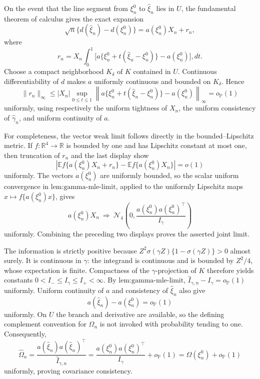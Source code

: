 On the event that the line segment from \(\xi_n^0\) to \(\widehat\xi_n\) lies in \(U\), the fundamental theorem of calculus gives the exact expansion
\[
 \sqrt n\{d(\widehat\xi_n)-d(\xi_n^0)\}
 =a(\xi_n^0)X_n+r_n,
\]
where
\[
 r_n=X_n\int_0^1
 \bigl[a\{\xi_n^0+t(\widehat\xi_n-\xi_n^0)\}-a(\xi_n^0)\bigr],dt.
\]
Choose a compact neighborhood \(K_\delta\) of \(K\) contained in \(U\).  Continuous differentiability of \(d\) makes \(a\) uniformly continuous and bounded on \(K_\delta\).  Hence
\[
 \|r_n\|_\infty
 \le |X_n|\sup_{0\le t\le1}
 \left\|a\{\xi_n^0+t(\widehat\xi_n-\xi_n^0)\}-a(\xi_n^0)\right\|_\infty
 =o_{\mathbb P}(1)
\]
uniformly, using respectively the uniform tightness of \(X_n\), the uniform consistency of \(\widehat\gamma_n\), and uniform continuity of \(a\).

For completeness, the vector weak limit follows directly in the bounded--Lipschitz metric.  If \(f:\mathbb R^4\to\mathbb R\) is bounded by one and has Lipschitz constant at most one, then truncation of \(r_n\) and the last display show
\[
 \left|\mathbb E f\{a(\xi_n^0)X_n+r_n\}
       -\mathbb E f\{a(\xi_n^0)X_n\}\right|=o(1)
\]
uniformly.  The vectors \(a(\xi_n^0)\) are uniformly bounded, so the scalar uniform convergence in \(\text{lem:gamma-mle-limit}\), applied to the uniformly Lipschitz maps \(x\mapsto f\{a(\xi_n^0)x\}\), gives
\[
 a(\xi_n^0)X_n\ \Rightarrow\
 \mathcal N_4\!\left(0,
   \frac{a(\xi_n^0)a(\xi_n^0)^\top}{I_\gamma}\right)
\]
uniformly.  Combining the preceding two displays proves the asserted joint limit.

The information is strictly positive because \(Z^2\sigma(\gamma Z)\{1-\sigma(\gamma Z)\}>0\) almost surely.  It is continuous in \(\gamma\): the integrand is continuous and is bounded by \(Z^2/4\), whose expectation is finite.  Compactness of the \(\gamma\)-projection of \(K\) therefore yields constants \(0<I_-\le I_\gamma\le I_+<\infty\).  By \(\text{lem:gamma-mle-limit}\), \(\widehat I_{\gamma,n}-I_\gamma=o_{\mathbb P}(1)\) uniformly.  Uniform continuity of \(a\) and consistency of \(\widehat\xi_n\) also give
\[
 a(\widehat\xi_n)-a(\xi_n^0)=o_{\mathbb P}(1)
\]
uniformly.  On \(U\) the branch and derivative are available, so the defining complement convention for \(\widehat\Omega_n\) is not invoked with probability tending to one.  Consequently,
\[
 \widehat\Omega_n
 =\frac{a(\widehat\xi_n)a(\widehat\xi_n)^\top}
        {\widehat I_{\gamma,n}}
 =\frac{a(\xi_n^0)a(\xi_n^0)^\top}{I_\gamma}
   +o_{\mathbb P}(1)
 =\Omega(\xi_n^0)+o_{\mathbb P}(1)
\]
uniformly, proving covariance consistency.

